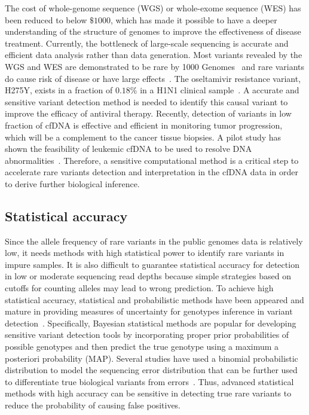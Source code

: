 \documentclass[a4,center,fleqn]{NAR}
\begin{document}
The cost of whole-genome sequence (WGS) or whole-exome sequence (WES) has been reduced to below $\$1000$, which has made it possible to have a deeper understanding of the structure of genomes to improve the effectiveness of disease treatment. 
Currently, the bottleneck of large-scale sequencing is accurate and efficient data analysis rather than data generation.
Most variants revealed by the WGS and WES are demonstrated to be rare by 1000 Genomes~\citep{10002010map} and rare variants do cause risk of disease or have large effects~\citep{kosmicki2016discovery}.
The oseltamivir resistance variant, H275Y, exists in a fraction of $0.18\%$ in a H1N1 clinical sample~\citep{Flaherty2012}.
A accurate and sensitive variant detection method is needed to identify this causal variant to improve the efficacy of antiviral therapy.
Recently, detection of variants in low fraction of cfDNA is effective and efficient in monitoring tumor progression, which will be a complement to the cancer tissue biopsies.
A pilot study has shown the feasibility of leukemic cfDNA to be used to resolve DNA abnormalities~\citep{zhou2014pilot}.
Therefore, a sensitive computational method is a critical step to accelerate rare variants detection and interpretation in the cfDNA data in order to derive further biological inference.


\subsection{Statistical accuracy}

Since the allele frequency of rare variants in the public genomes data is relatively low, it needs methods with high statistical power to identify rare variants in impure samples. 
It is also difficult to guarantee statistical accuracy for detection in low or moderate sequencing read depths because simple strategies based on cutoffs for counting alleles may lead to wrong prediction.
To achieve high statistical accuracy, statistical and probabilistic methods have been appeared and mature in providing measures of uncertainty for genotypes inference in variant detection~\citep{Nielsen2011}.  
Specifically, Bayesian statistical methods are popular for developing sensitive variant detection tools by incorporating proper prior probabilities of possible genotypes and then predict the true genotype using a maximum a posteriori probability (MAP).
Several studies have used a binomial probabilistic distribution to model the sequencing error distribution that can be further used to differentiate true biological variants from errors~\citep{Flaherty2012, Shiraishi2013, gerstung2012reliable, Christoforides2013}.
Thus, advanced statistical methods with high accuracy can be sensitive in detecting true rare variants to reduce the probability of causing false positives.
\end{document}
